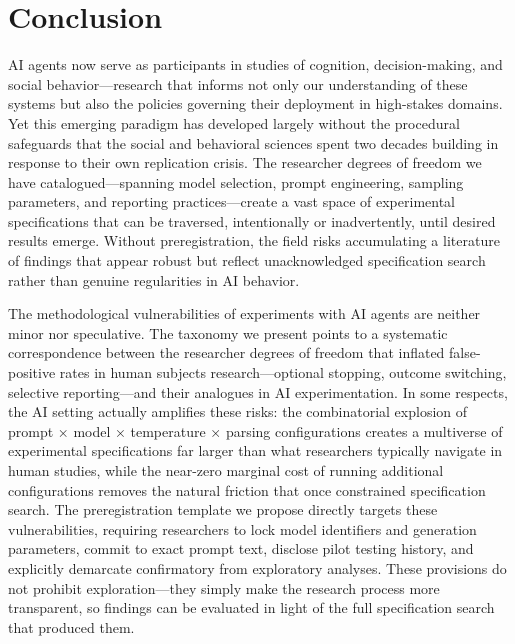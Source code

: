 \documentclass{article}
\theoremstyle{plain}
\theoremstyle{definition}
\theoremstyle{remark}
\begin{document}
\section{Conclusion}
AI agents now serve as participants in studies of cognition, decision-making, and social behavior—research that informs not only our understanding of these systems but also the policies governing their deployment in high-stakes domains. Yet this emerging paradigm has developed largely without the procedural safeguards that the social and behavioral sciences spent two decades building in response to their own replication crisis. The researcher degrees of freedom we have catalogued—spanning model selection, prompt engineering, sampling parameters, and reporting practices—create a vast space of experimental specifications that can be traversed, intentionally or inadvertently, until desired results emerge. Without preregistration, the field risks accumulating a literature of findings that appear robust but reflect unacknowledged specification search rather than genuine regularities in AI behavior.

The methodological vulnerabilities of experiments with AI agents are neither minor nor speculative. The taxonomy we present points to a systematic correspondence between the researcher degrees of freedom that inflated false-positive rates in human subjects research—optional stopping, outcome switching, selective reporting—and their analogues in AI experimentation. In some respects, the AI setting actually amplifies these risks: the combinatorial explosion of prompt × model × temperature × parsing configurations creates a multiverse of experimental specifications far larger than what researchers typically navigate in human studies, while the near-zero marginal cost of running additional configurations removes the natural friction that once constrained specification search. The preregistration template we propose directly targets these vulnerabilities, requiring researchers to lock model identifiers and generation parameters, commit to exact prompt text, disclose pilot testing history, and explicitly demarcate confirmatory from exploratory analyses. These provisions do not prohibit exploration—they simply make the research process more transparent, so findings can be evaluated in light of the full specification search that produced them.
\end{document}

